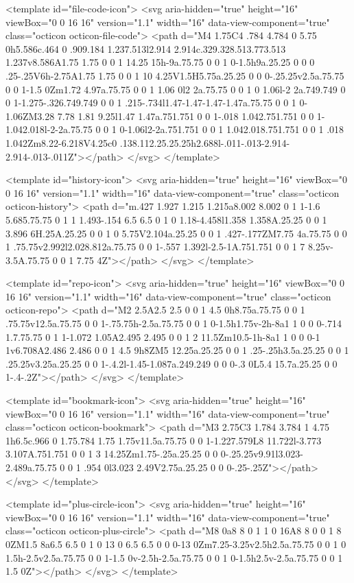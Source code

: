 <template id="file-code-icon">
  <svg aria-hidden="true" height="16" viewBox="0 0 16 16" version="1.1" width="16" data-view-component="true" class="octicon octicon-file-code">
    <path d="M4 1.75C4 .784 4.784 0 5.75 0h5.586c.464 0 .909.184 1.237.513l2.914 2.914c.329.328.513.773.513 1.237v8.586A1.75 1.75 0 0 1 14.25 15h-9a.75.75 0 0 1 0-1.5h9a.25.25 0 0 0 .25-.25V6h-2.75A1.75 1.75 0 0 1 10 4.25V1.5H5.75a.25.25 0 0 0-.25.25v2.5a.75.75 0 0 1-1.5 0Zm1.72 4.97a.75.75 0 0 1 1.06 0l2 2a.75.75 0 0 1 0 1.06l-2 2a.749.749 0 0 1-1.275-.326.749.749 0 0 1 .215-.734l1.47-1.47-1.47-1.47a.75.75 0 0 1 0-1.06ZM3.28 7.78 1.81 9.25l1.47 1.47a.751.751 0 0 1-.018 1.042.751.751 0 0 1-1.042.018l-2-2a.75.75 0 0 1 0-1.06l2-2a.751.751 0 0 1 1.042.018.751.751 0 0 1 .018 1.042Zm8.22-6.218V4.25c0 .138.112.25.25.25h2.688l-.011-.013-2.914-2.914-.013-.011Z"></path>
</svg>
</template>

<template id="history-icon">
  <svg aria-hidden="true" height="16" viewBox="0 0 16 16" version="1.1" width="16" data-view-component="true" class="octicon octicon-history">
    <path d="m.427 1.927 1.215 1.215a8.002 8.002 0 1 1-1.6 5.685.75.75 0 1 1 1.493-.154 6.5 6.5 0 1 0 1.18-4.458l1.358 1.358A.25.25 0 0 1 3.896 6H.25A.25.25 0 0 1 0 5.75V2.104a.25.25 0 0 1 .427-.177ZM7.75 4a.75.75 0 0 1 .75.75v2.992l2.028.812a.75.75 0 0 1-.557 1.392l-2.5-1A.751.751 0 0 1 7 8.25v-3.5A.75.75 0 0 1 7.75 4Z"></path>
</svg>
</template>

<template id="repo-icon">
  <svg aria-hidden="true" height="16" viewBox="0 0 16 16" version="1.1" width="16" data-view-component="true" class="octicon octicon-repo">
    <path d="M2 2.5A2.5 2.5 0 0 1 4.5 0h8.75a.75.75 0 0 1 .75.75v12.5a.75.75 0 0 1-.75.75h-2.5a.75.75 0 0 1 0-1.5h1.75v-2h-8a1 1 0 0 0-.714 1.7.75.75 0 1 1-1.072 1.05A2.495 2.495 0 0 1 2 11.5Zm10.5-1h-8a1 1 0 0 0-1 1v6.708A2.486 2.486 0 0 1 4.5 9h8ZM5 12.25a.25.25 0 0 1 .25-.25h3.5a.25.25 0 0 1 .25.25v3.25a.25.25 0 0 1-.4.2l-1.45-1.087a.249.249 0 0 0-.3 0L5.4 15.7a.25.25 0 0 1-.4-.2Z"></path>
</svg>
</template>

<template id="bookmark-icon">
  <svg aria-hidden="true" height="16" viewBox="0 0 16 16" version="1.1" width="16" data-view-component="true" class="octicon octicon-bookmark">
    <path d="M3 2.75C3 1.784 3.784 1 4.75 1h6.5c.966 0 1.75.784 1.75 1.75v11.5a.75.75 0 0 1-1.227.579L8 11.722l-3.773 3.107A.751.751 0 0 1 3 14.25Zm1.75-.25a.25.25 0 0 0-.25.25v9.91l3.023-2.489a.75.75 0 0 1 .954 0l3.023 2.49V2.75a.25.25 0 0 0-.25-.25Z"></path>
</svg>
</template>

<template id="plus-circle-icon">
  <svg aria-hidden="true" height="16" viewBox="0 0 16 16" version="1.1" width="16" data-view-component="true" class="octicon octicon-plus-circle">
    <path d="M8 0a8 8 0 1 1 0 16A8 8 0 0 1 8 0ZM1.5 8a6.5 6.5 0 1 0 13 0 6.5 6.5 0 0 0-13 0Zm7.25-3.25v2.5h2.5a.75.75 0 0 1 0 1.5h-2.5v2.5a.75.75 0 0 1-1.5 0v-2.5h-2.5a.75.75 0 0 1 0-1.5h2.5v-2.5a.75.75 0 0 1 1.5 0Z"></path>
</svg>
</template>

